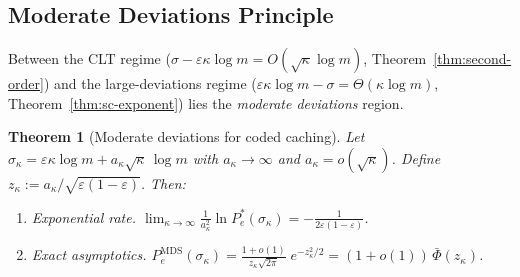 \documentclass[journal]{IEEEtran}
\newtheorem{theorem}{Theorem}[section]
\numberwithin{equation}{section}
\begin{document}
\subsection{Moderate Deviations Principle}
\label{subsec:moderate-dev}

Between the CLT regime
($\sigma{-}\varepsilon\kappa\log m=O(\sqrt\kappa\log m)$,
Theorem~\ref{thm:second-order}) and the large-deviations
regime ($\varepsilon\kappa\log m{-}\sigma=\Theta(\kappa\log m)$,
Theorem~\ref{thm:sc-exponent}) lies the
\emph{moderate deviations} region.

\begin{theorem}[Moderate deviations for coded caching]
\label{thm:moderate-dev}
Let
$\sigma_\kappa
=\varepsilon\kappa\log m
+a_\kappa\sqrt\kappa\,\log m$
with $a_\kappa\to\infty$ and
$a_\kappa=o(\sqrt\kappa)$.
Define
$z_\kappa:=a_\kappa/\sqrt{\varepsilon(1{-}\varepsilon)}$.
Then:
\begin{enumerate}[label=\textup{(\roman*)}]
\item \emph{Exponential rate.}\;
$\displaystyle
  \lim_{\kappa\to\infty}
  \frac{1}{a_\kappa^2}
  \ln P_e^*(\sigma_\kappa)
  =-\frac{1}{2\varepsilon(1{-}\varepsilon)}$.

\item \emph{Exact asymptotics.}\;
$\displaystyle
  P_e^{\mathrm{MDS}}(\sigma_\kappa)
  =\frac{1{+}o(1)}{z_\kappa\sqrt{2\pi}}\;
  e^{-z_\kappa^2/2}
  =(1{+}o(1))\,\bar\Phi(z_\kappa)$.
\end{enumerate}
\end{theorem}
\end{document}
